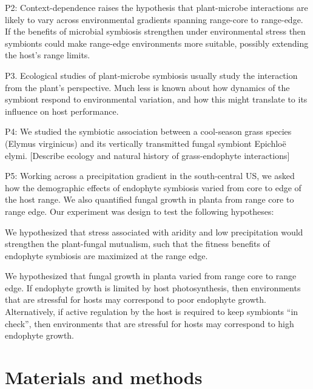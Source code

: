 \documentclass[11pt]{article}
\begin{document}
P2: Context-dependence raises the hypothesis that plant-microbe interactions are likely to vary across environmental gradients spanning range-core to range-edge. 
If the benefits of microbial symbiosis strengthen under environmental stress then symbionts could make range-edge environments more suitable, possibly extending the host’s range limits. 

P3. Ecological studies of plant-microbe symbiosis usually study the interaction from the plant’s perspective. 
Much less is known about how dynamics of the symbiont respond to environmental variation, and how this might translate to its influence on host performance. 

P4: We studied the symbiotic association between a cool-season grass species (Elymus virginicus) and its vertically transmitted fungal symbiont Epichloë elymi. [Describe ecology and natural history of grass-endophyte interactions]

P5: Working across a precipitation gradient in the south-central US, we asked how the demographic effects of endophyte symbiosis varied from core to edge of the host range.
We also quantified fungal growth in planta from range core to range edge. 
Our experiment was design to test the following hypotheses:

We hypothesized that stress associated with aridity and low precipitation would strengthen the plant-fungal mutualism, such that the fitness benefits of endophyte symbiosis are maximized at the range edge. 

We hypothesized that fungal growth in planta varied from range core to range edge. If endophyte growth is limited by host photosynthesis, then environments that are stressful for hosts may correspond to poor endophyte growth. Alternatively, if active regulation by the host is required to keep symbionts “in check”, then environments that are stressful for hosts may correspond to high endophyte growth.


\section*{Materials and methods}
\end{document}
